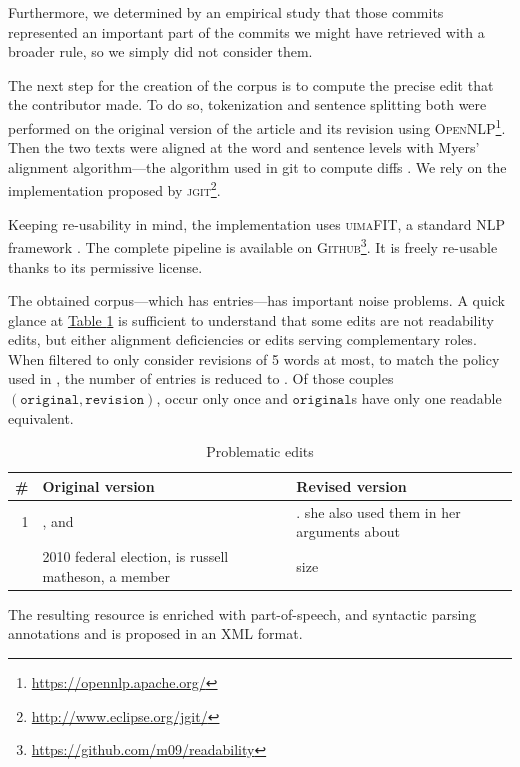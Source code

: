 \documentclass[a4paper, 11pt, onepage]{scrreprt}
\newcommand\tableref[1]{\hyperref[#1]{Table \ref*{#1}}}
\begin{document}
Furthermore, we determined by an empirical study that those commits
represented an important part of the commits we might have retrieved
with a broader rule, so we simply did not consider them.

The next step for the creation of the corpus is to compute the precise
edit that the contributor made. To do so, tokenization and sentence
splitting both were performed on the original version of the article
and its revision using
\textsc{OpenNLP}\footnote{\url{https://opennlp.apache.org/}}. Then the
two texts were aligned at the word and sentence levels with Myers'
alignment algorithm—the algorithm used in git to compute diffs
\cite{myers1988optimal}. We rely on the implementation proposed by
\textsc{jgit}\footnote{\url{http://www.eclipse.org/jgit/}}.

Keeping re-usability in mind, the implementation uses
\textsc{uimaFIT}, a standard NLP framework
\cite{ogren-bethard:2009:SETQA-NLP}. The complete pipeline is
available on
\textsc{Github}\footnote{\url{https://github.com/m09/readability}}. It
is freely re-usable thanks to its permissive license.

The obtained corpus—which has  entries—has important
noise problems. A quick glance at \tableref{tab:problematic-edits} is
sufficient to understand that some edits are not readability edits,
but either alignment deficiencies or edits serving complementary
roles. When filtered to only consider revisions of 5 words at most, to
match the policy used in \cite{yatskar2010sake}, the number of entries
is reduced to . Of those  couples
$(\mathtt{original}, \mathtt{revision})$,  occur only
once and  $\mathtt{original}$s have only one readable
equivalent.

\begin{table}[H]
  \centering
  \caption{Problematic edits}
  \begin{tabular}{rp{6cm}p{6cm}}
    \toprule
    \# & Original version & Revised version \\
    \midrule
    1 & , and & . she also used them in her arguments about \\
    \addlinespace
    2 & 2010 federal election, is russell matheson, a member & size\\
  \end{tabular}
  \label{tab:problematic-edits}
\end{table}

The resulting resource is enriched with part-of-speech, and syntactic
parsing annotations and is proposed in an XML format.
\end{document}
